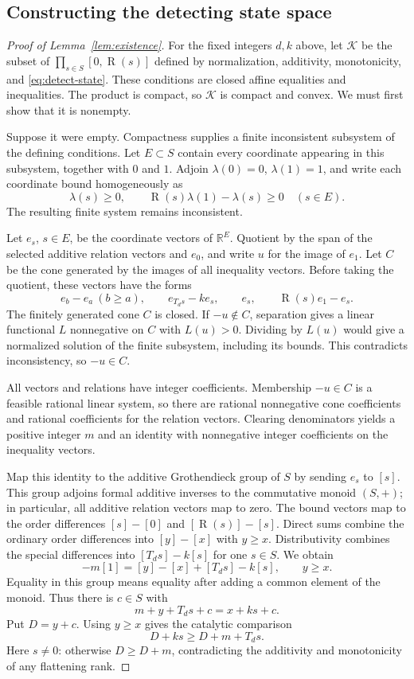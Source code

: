 \documentclass[11pt]{article}
\theoremstyle{definition}
\theoremstyle{remark}
\DeclareMathOperator{\rank}{R}
\newcommand{\R}{\mathbb R}
\numberwithin{equation}{section}
\begin{document}
\subsection{Constructing the detecting state space}

\begin{proof}[Proof of Lemma~\ref{lem:existence}]
For the fixed integers $d,k$ above, let $\mathcal K$ be the subset of
$\prod_{s\in S}[0,\rank(s)]$ defined by normalization, additivity,
monotonicity, and \eqref{eq:detect-state}. These conditions are closed affine equalities and inequalities. The product is compact, so $\mathcal K$ is compact and
convex. We must first show that it is nonempty.

Suppose it were empty. Compactness supplies a finite inconsistent
subsystem of the defining conditions. Let $E\subset S$ contain every
coordinate appearing in this subsystem, together with $0$ and $1$.
Adjoin $\lambda(0)=0$, $\lambda(1)=1$, and write each coordinate bound
homogeneously as
\[
 \lambda(s)\geq0,\qquad
 \rank(s)\lambda(1)-\lambda(s)\geq0\quad(s\in E).
\]
The resulting finite system remains inconsistent.

Let $e_s$, $s\in E$, be the coordinate vectors of $\R^E$.
Quotient by the span of the selected additive relation vectors and
$e_0$, and write $u$ for the image of $e_1$. Let $C$ be the cone
generated by the images of all inequality vectors. Before taking the
quotient, these vectors have the forms
\[
 e_b-e_a\ (b\geq a),\qquad e_{T_ds}-ke_s,\qquad
 e_s,\qquad \rank(s)e_1-e_s.
\]
The finitely generated cone $C$ is closed. If $-u\notin C$, separation
gives a linear functional $L$ nonnegative on $C$ with $L(u)>0$.
Dividing by $L(u)$ would give a normalized solution of the finite
subsystem, including its bounds. This contradicts inconsistency, so
$-u\in C$.

All vectors and relations have integer coefficients. Membership
$-u\in C$ is a feasible rational linear system, so there are rational
nonnegative cone coefficients and rational coefficients for the
relation vectors. Clearing denominators yields a positive integer
$m$ and an identity with nonnegative integer coefficients on the
inequality vectors.

Map this identity to the additive Grothendieck group of $S$ by sending
$e_s$ to $[s]$. This group adjoins formal additive inverses to the
commutative monoid $(S,+)$; in particular, all additive relation
vectors map to zero. The bound vectors map to the order differences
$[s]-[0]$ and $[\rank(s)]-[s]$. Direct sums combine the ordinary order
differences into $[y]-[x]$ with $y\geq x$. Distributivity combines the
special differences into $[T_ds]-k[s]$ for one $s\in S$. We obtain
\[
 -m[1]=[y]-[x]+[T_ds]-k[s],\qquad y\geq x.
\]
Equality in this group means equality after adding a common element
of the monoid. Thus there is $c\in S$ with
\[
 m+y+T_ds+c=x+ks+c.
\]
Put $D=y+c$. Using $y\geq x$ gives the catalytic comparison
\begin{equation}\label{eq:catalyst}
 D+ks\geq D+m+T_ds.
\end{equation}
Here $s\ne0$: otherwise $D\geq D+m$, contradicting the additivity
and monotonicity of any flattening rank.


\end{proof}
\end{document}
